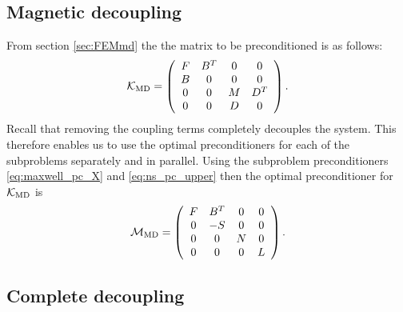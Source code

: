 \subsection{Magnetic decoupling}
\label{sec:MDprecond}

From section \ref{sec:FEMmd} the the matrix to be preconditioned is as follows:
\begin{equation}
   \mathcal{K}_{\rm MD} =
    \left(
    \begin{array}{cccc}
    F& B^T & 0 & 0\\
    B & 0 & 0 & 0 \\
    0 & 0 & M & D^T\\
    0 & 0 & D & 0
    \end{array}
    \right).
\end{equation}
Recall that removing the coupling terms completely decouples the system. This therefore enables us to use the optimal preconditioners for each of the subproblems separately and in parallel. Using the subproblem preconditioners \eqref{eq:maxwell_pc_X} and \eqref{eq:ns_pc_upper} then the optimal preconditioner for $\mathcal{K}_{\rm MD}$ is
\begin{equation}
\label{eq:mhd_pc_explicit}
\mathcal{M}_{\rm MD} =
\left(
\begin{array}{cccc}
F & B^T & 0 & 0\\
0 & -{S} & 0 & 0 \\
0 & 0 & N & 0\\
0 & 0 & 0 & L
\end{array}
\right).
\end{equation}


\subsection{Complete decoupling}
\label{sec:CDprecond}


